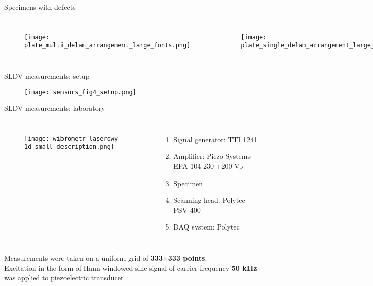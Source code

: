 \documentclass[10pt,aspectratio=169,dvipsnames]{beamer} %
\begin{document}
		\begin{frame}[t]{Specimens with defects}
			\vspace{-0.5cm}
			\begin{columns}[T]
				\begin{figure}
					\texttt{[image: plate\_multi\_delam\_arrangement\_large\_fonts.png]}
				\end{figure}
				\begin{figure}
					\texttt{[image: plate\_single\_delam\_arrangement\_large\_fonts.png]}
				\end{figure}
			\end{columns}
		\end{frame}
		\begin{frame}[t]{SLDV measurements: setup}
			\begin{figure}
				\texttt{[image: sensors\_fig4\_setup.png]}
			\end{figure}
		\end{frame}
		\begin{frame}[t]{SLDV measurements: laboratory}
			\begin{columns}[T]
				\begin{figure}
					\texttt{[image: wibrometr-laserowy-1d\_small-description.png]}
				\end{figure}
				\begin{enumerate}
					\item Signal generator: TTI 1241 
					\item Amplifier: Piezo Systems EPA-104-230 $\pm$200 Vp
					\item Specimen
					\item Scanning head: Polytec PSV-400
					\item DAQ system: Polytec
				\end{enumerate}
			\end{columns}
			{\small
				Measurements were taken on a uniform grid of \textbf{333$\times$333 points}.\\
				Excitation in the form of Hann windowed sine signal of carrier frequency \textbf{50 kHz} was applied to piezoelectric transducer.}
		\end{frame}
		
\end{document}
